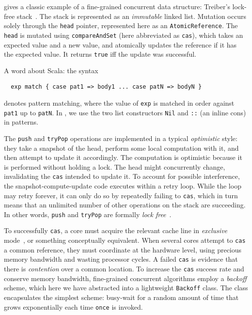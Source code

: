 \documentclass[preprint]{sigplanconf}
\begin{document}
 gives a classic example of a fine-grained concurrent
data structure: Treiber's lock-free stack~\cite{?}.  The stack is represented as
an \emph{immutable} linked list.  Mutation occurs solely through the
\lstinline{head} pointer, represented here as an \lstinline{AtomicReference}.
The \lstinline{head} is mutated using \lstinline{compareAndSet} (here
abbreviated as \lstinline{cas}), which takes an expected value and a new value,
and atomically updates the reference if it has the expected value.  It returns
\lstinline{true} iff the update was successful.

A word about Scala: the syntax 
\begin{lstlisting}
  exp match { case pat1 => body1 ... case patN => bodyN }
\end{lstlisting}
denotes pattern matching, where the value of \lstinline{exp} is matched in order
against \lstinline{pat1} up to \lstinline{patN}.  In ,
we use the two list constructors \lstinline{Nil} and \lstinline{::} (an inline
cons) in patterns.

The \lstinline{push} and \lstinline{tryPop} operations are implemented in a
typical \emph{optimistic} style: they take a snapshot of the head, perform some
local computation with it, and then attempt to update it accordingly.  The
computation is optimistic because it is performed without holding a lock.  The
head might concurrently change, invalidating the \lstinline{cas} intended to
update it.  To account for possible interference, the snapshot-compute-update
code executes within a retry loop.  While the loop may retry forever, it can
only do so by repeatedly failing to \lstinline{cas}, which in turn means that an
unlimited number of other operations on the stack are succeeding.  In other
words, \lstinline{push} and \lstinline{tryPop} are formally \emph{lock
  free}~\cite{?}.

To successfully \lstinline{cas}, a core must acquire the relevant cache line in
\emph{exclusive} mode~\cite{?}, or something conceptually equivalent.  When
several cores attempt to \lstinline{cas} a common reference, they must
coordinate at the hardware level, using precious memory bandwidth and wasting
processor cycles.  A failed \lstinline{cas} is evidence that there is
\emph{contention} over a common location.  To increase the \lstinline{cas}
success rate and conserve memory bandwidth, fine-grained concurrent algorithms
employ a \emph{backoff} scheme, which here we have abstracted into a lightweight
\lstinline{Backoff} class.  The class encapsulates the simplest scheme:
busy-wait for a random amount of time that grows exponentially each time
\lstinline{once} is invoked.  
\end{document}
